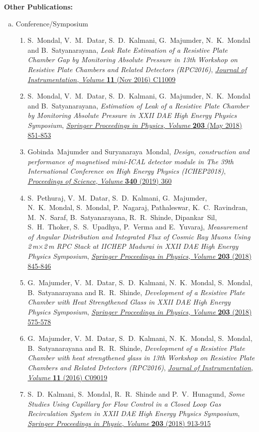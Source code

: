 \noindent\textbf{Other Publications:}
\begin{enumerate}[a.]
\item Conference/Symposium
  \begin{enumerate}[1)]
  \item S.~Mondal, V.~M.~Datar, S.~D.~Kalmani, G.~Majumder, N.~K.~Mondal and B.~Satyanarayana, \emph{Leak Rate Estimation of a Resistive Plate Chamber Gap by Monitoring Absolute Pressure in 13th Workshop on Resistive Plate Chambers and Related Detectors (RPC2016)}, \href{https://doi.org/10.1088/1748-0221/11/11/C11009}{\emph{Journal of Instrumentation, Volume } \textbf{11} (Nov 2016) C11009}
  \item S.~Mondal, V.~M.~Datar, S.~D.~Kalmani, G.~Majumder, N.~K.~Mondal and B.~Satyanarayana, \emph{Estimation of Leak of a Resistive Plate Chamber by Monitoring Absolute Pressure in XXII DAE High Energy Physics Symposium}, \href{https://doi.org/10.1007/978-3-319-73171-1_207}{\emph{Springer Proceedings in Physics, Volume } \textbf{203} (May 2018) 851-853}
  \item Gobinda~Majumder and Suryanaraya~Mondal, \emph{Design, construction and performance of magnetised mini-ICAL detector module in The 39th International Conference on High Energy Physics (ICHEP2018)}, \href{https://doi.org/10.22323/1.340.0360}{\emph{Proceedings of Science,} \textit{Volume} \textbf{340} (2019) 360}
  \item S.~Pethuraj, V.~M.~Datar, S.~D.~Kalmani, G.~Majumder, N.~K.~Mondal, S.~Mondal, P.~Nagaraj, Pathaleswar, K.~C.~Ravindran, M.~N.~Saraf, B.~Satyanarayana, R.~R.~Shinde, Dipankar~Sil, S.~H.~Thoker, S.~S.~Upadhya, P.~Verma and E.~Yuvaraj, \emph{Measurement of Angular Distribution and Integrated Flux of Cosmic Ray Muons Using 2\,m$\times$2\,m RPC Stack at IICHEP Madurai in XXII DAE High Energy Physics Symposium}, \href{https://doi.org/10.1007/978-3-319-73171-1_205}{\emph{Springer Proceedings in Physics,} \emph{Volume} \textbf{203} (2018) 845-846}
  \item G.~Majumder, V.~M.~Datar, S.~D.~Kalmani, N.~K.~Mondal, S.~Mondal, B.~Satyanarayana and R.~R.~Shinde, \emph{Development of a Resistive Plate Chamber with Heat Strengthened Glass in XXII DAE High Energy Physics Symposium}, \href{https://doi.org/10.1007/978-3-319-73171-1_135}{\emph{Springer Proceedings in Physics, Volume} \textbf{203} (2018) 575-578}
  \item  G.~Majumder, V.~M.~Datar, S.~D.~Kalmani, N.~K.~Mondal, S.~Mondal, B.~Satyanarayana and R.~R.~Shinde, \emph{Development of a Resistive Plate Chamber with heat strengthened glass in 13th Workshop on Resistive Plate Chambers and Related Detectors (RPC2016)}, \href{https://doi.org/10.1088/1748-0221/11/09/C09019}{\emph{Journal of Instrumentation, Volume} \textbf{11} (2016) C09019}
  \item S.~D.~Kalmani, S.~Mondal, R.~R.~Shinde and P.~V.~Hunagund, \emph{Some Studies Using Capillary for Flow Control in a Closed Loop Gas Recirculation System in XXII DAE High Energy Physics Symposium}, \href{https://doi.org/10.1007/978-3-319-73171-1_223}{\emph{Springer Proceedings in Physic, Volume} \textbf{203} (2018) 913-915}
  \end{enumerate}
\end{enumerate}


